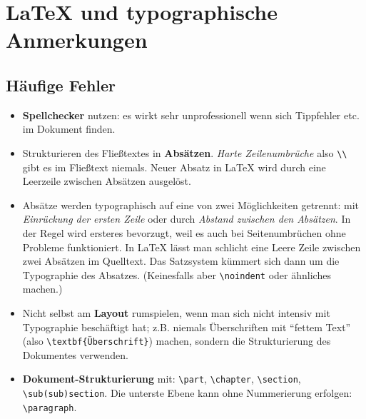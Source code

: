 \documentclass[twoside, a4paper, DIV=11, open=any, bibliography=totoc]{scrbook}
\begin{document}
\appendix
\chapter{\LaTeX{} und typographische Anmerkungen} \label{chap:latexRes}

\section{Häufige Fehler} \label{sec:fehler}

\begin{itemize}
    \item \textbf{Spellchecker} nutzen: es wirkt sehr unprofessionell wenn sich Tippfehler etc. im Dokument finden.
    \item Strukturieren des Fließtextes in \textbf{Absätzen}. \textit{Harte Zeilenumbrüche} also \verb+\\+ gibt es im Fließtext niemals. Neuer Absatz in \LaTeX{} wird durch eine Leerzeile zwischen Absätzen ausgelöst.
    \item Absätze werden typographisch auf eine von zwei Möglichkeiten getrennt: mit \textit{Einrückung der ersten Zeile} oder durch \textit{Abstand zwischen den Absätzen}. In der Regel wird ersteres bevorzugt, weil es auch bei Seitenumbrüchen ohne Probleme funktioniert. In \LaTeX{} lässt man schlicht eine Leere Zeile zwischen zwei Absätzen im Quelltext. Das Satzsystem kümmert sich dann um die Typographie des Absatzes. (Keinesfalls aber \verb+\noindent+ oder ähnliches machen.)
    \item Nicht selbst am \textbf{Layout} rumspielen, wenn man sich nicht intensiv mit Typographie beschäftigt hat; z.B. niemals Überschriften mit "`fettem Text"' (also \verb+\textbf{Überschrift}+) machen, sondern die Strukturierung des Dokumentes verwenden.
    \item \textbf{Dokument-Strukturierung} mit: \verb+\part+, \verb+\chapter+, \verb+\section+, \verb+\sub(sub)section+. Die unterste Ebene kann ohne Nummerierung erfolgen: \verb+\paragraph+.

\end{itemize}
\end{document}
